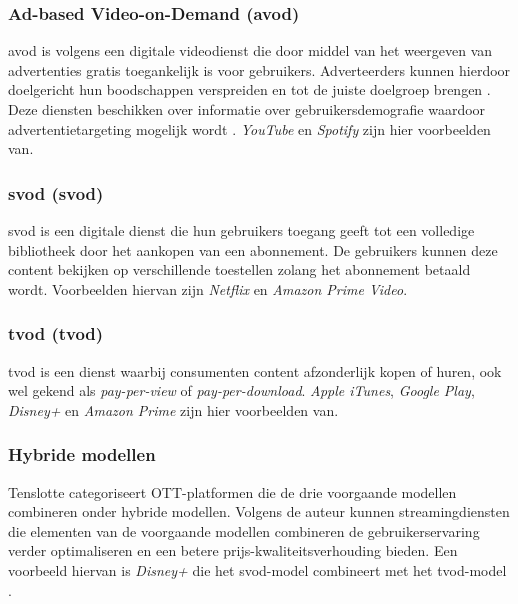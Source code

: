 \subsubsection{Ad-based Video-on-Demand (\acrshort{avod})}

\acrshort{avod} is volgens \textcite{Mulla2022} een digitale videodienst die door middel van het weergeven van advertenties gratis toegankelijk is voor gebruikers. Adverteerders kunnen hierdoor doelgericht hun boodschappen verspreiden en tot de juiste doelgroep brengen \autocite{Mulla2022}. Deze diensten beschikken over informatie over gebruikersdemografie waardoor advertentietargeting mogelijk wordt \autocite{Mulla2022}. \textit{YouTube} en \textit{Spotify} zijn hier voorbeelden van. 

\vspace{0.5em}

\subsubsection{\acrlong{svod} (\acrshort{svod})}

\acrshort{svod} is een digitale dienst die hun gebruikers toegang geeft tot een volledige bibliotheek door het aankopen van een abonnement. De gebruikers kunnen deze content bekijken op verschillende toestellen zolang het abonnement betaald wordt. Voorbeelden hiervan zijn \textit{Netflix} en \textit{Amazon Prime Video}. \autocite{Mulla2022}

\vspace{0.5em}

\subsubsection{\acrlong{tvod} (\acrshort{tvod})}

\acrshort{tvod} is een dienst waarbij consumenten content afzonderlijk kopen of huren, ook wel gekend als \textit{pay-per-view} of \textit{pay-per-download}. \textit{Apple iTunes}, \textit{Google Play}, \textit{Disney+} en \textit{Amazon Prime} zijn hier voorbeelden van. \autocite{Mulla2022}

\vspace{0.5em}

\subsubsection{Hybride modellen}

Tenslotte categoriseert \textcite{Mulla2022} OTT-platformen die de drie voorgaande modellen combineren onder hybride modellen. Volgens de auteur kunnen streamingdiensten die elementen van de voorgaande modellen combineren de gebruikerservaring verder optimaliseren en een betere prijs-kwaliteitsverhouding bieden. Een voorbeeld hiervan is \textit{Disney+} die het \acrshort{svod}-model combineert met het \acrshort{tvod}-model \autocite{Mulla2022}. 

